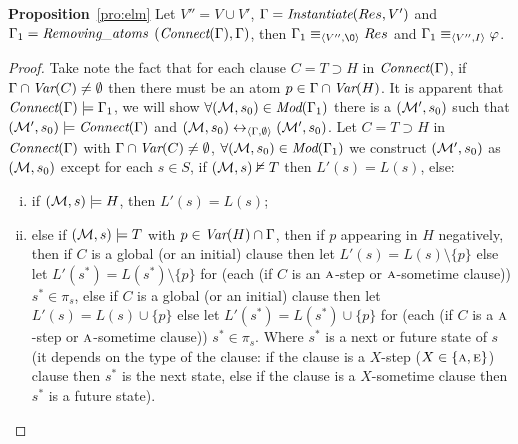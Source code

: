 \documentclass{article}
\begin{document}
\textbf{Proposition}~\ref{pro:elm}
Let $V''=V \cup V'$, $\Gamma=\emph{Instantiate}(Res, V')$ and $\Gamma_1=\emph{Removing\_atoms}$ $(\emph{Connect}(\Gamma), \Gamma)$, then  $\Gamma_1\equiv_{\tuple{V'', {\O}}} Res$ and $\Gamma_1 \equiv_{{\langle{V'', I}\rangle}} \varphi$.
\begin{proof}
Take note the fact that for each clause $C = T \supset H$ in $\emph{Connect}(\Gamma)$, if $\Gamma \cap \textit{Var}(C) \neq \emptyset$ then there must be an atom $p\in \Gamma \cap \textit{Var}(H)$. It is apparent that $\emph{Connect}(\Gamma) \models \Gamma_1$, we will show $\forall ({\cal M}, s_0) \in \textit{Mod}(\Gamma_1)$ there is a $({\cal M}', s_0)$ such that $({\cal M}', s_0) \models \emph{Connect}(\Gamma)$ and $({\cal M}, s_0) \leftrightarrow_{{\langle{\Gamma, \emptyset}\rangle}} ({\cal M}', s_0)$.
Let $C = T \supset H$ in $\emph{Connect}(\Gamma)$ with $\Gamma \cap \textit{Var}(C) \neq \emptyset$,
$\forall ({\cal M}, s_0) \in \textit{Mod}(\Gamma_1)$ we construct $({\cal M}', s_0)$ as $({\cal M}, s_0)$ except
 for each $s\in S$, if $({\cal M}, s) \nvDash T$ then $L'(s) = L(s)$, else:
\begin{enumerate}[(i)]
  \item if $({\cal M},s) \models H$, then $L'(s) = L(s)$;
  \item else if $({\cal M}, s) \models T$ with $p \in \textit{Var}(H)\cap \Gamma$, then if $p$ appearing in $H$ negatively, then if $C$ is a global (or an initial) clause then let $L'(s) = L(s) \setminus \{p\}$ else let $L'(s^*) = L(s^*) \setminus \{p\}$ for (each (if $C$ is an $\textsc{a}$-step or $\textsc{a}$-sometime clause)) $s^* \in \pi_s$, else if $C$ is a global (or an initial) clause then let $L'(s) = L(s) \cup \{p\}$ else let $L'(s^*) = L(s^*) \cup \{p\}$ for (each (if $C$ is a $\textsc{a}$-step or $\textsc{a}$-sometime clause)) $s^* \in \pi_s$. Where $s^*$ is a next or future state of $s$ (it depends on the type of the clause: if the clause is a $X$-step ($X\in \{\textsc{a}, \textsc{e}\}$) clause then $s^*$ is the next state, else if the clause is a $X$-sometime clause then $s^*$ is a future state).
\end{enumerate}


\end{proof}
\end{document}
